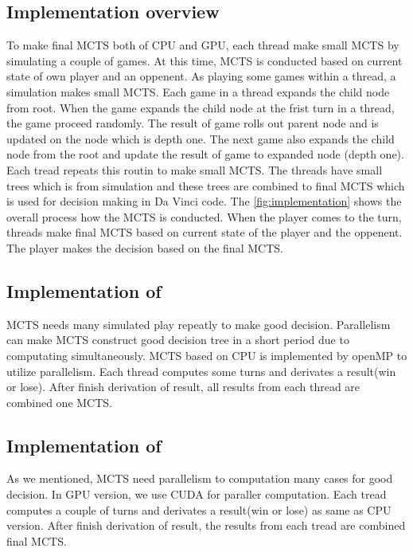 \subsection{Implementation overview}
To make final MCTS both of CPU and GPU, each thread make small MCTS by simulating a couple of games.
At this time, MCTS is conducted based on current state of own player and an oppenent.
As playing some games within a thread, a simulation makes small MCTS.
Each game in a thread expands the child node from root. 
When the game expands the child node at the frist turn in a thread, the game proceed randomly. 
The result of game rolls out parent node and is updated on the node which is depth one. 
The next game also expands the child node from the root and update the result of game to expanded node (depth one).
Each tread repeats this routin to make small MCTS. 
The threads have small trees which is from simulation and these trees are combined to final MCTS which is used for decision making in Da Vinci code. 
The \cref{fig:implementation} shows the overall process how the MCTS is conducted.
When the player comes to the turn, threads make final MCTS based on current state of the player and the oppenent. 
The player makes the decision based on the final MCTS. 

\subsection{Implementation of \cpu}
MCTS needs many simulated play repeatly to make good decision. 
Parallelism can make MCTS construct good decision tree in a short period due to computating simultaneously. 
MCTS based on CPU is implemented by openMP to utilize parallelism. Each thread computes some turns and derivates a result(win or lose). 
After finish derivation of result, all results from each thread are combined one MCTS.


\subsection{Implementation of \gpu}
As we mentioned, MCTS need parallelism to computation many cases for good decision. 
In GPU version, we use CUDA for paraller computation. 
Each tread computes a couple of turns and derivates a result(win or lose) as same as CPU version. 
After finish derivation of result, the results from each tread are combined final MCTS. 